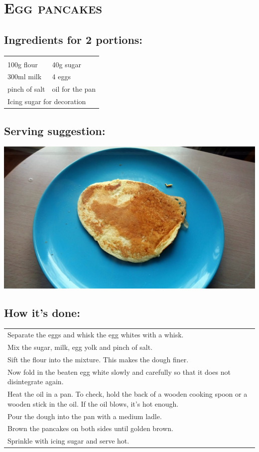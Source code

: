 \section{\textsc{Egg pancakes}}

\subsection*{Ingredients for 2 portions:}

\begin{tabular}{p{7.5cm} p{7.5cm}}
	& \\
	100g flour & 40g sugar \\
	300ml milk & 4 eggs \\
	pinch of salt & oil for the pan \\
	\multicolumn{2}{l}{Icing sugar for decoration}
\end{tabular}

\subsection*{Serving suggestion:}

\includegraphics[width=\textwidth]{img/pancakes/pancakes_gebraten.jpg} \cite{pancakes}

\subsection*{How it's done:}

\begin{tabular}{p{15cm}}
	\\
  Separate the eggs and whisk the egg whites with a whisk.\\
  Mix the sugar, milk, egg yolk and pinch of salt.\\
  Sift the flour into the mixture. This makes the dough finer.\\
  Now fold in the beaten egg white slowly and carefully so that it does not disintegrate again.\\
  Heat the oil in a pan. To check, hold the back of a wooden cooking spoon or a wooden stick in the oil. If the oil blows, it's hot enough.\\
  Pour the dough into the pan with a medium ladle.\\
  Brown the pancakes on both sides until golden brown.\\
  Sprinkle with icing sugar and serve hot.
\end{tabular}
